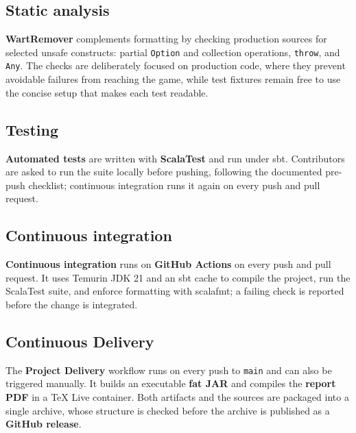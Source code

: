 \subsection{Static analysis}

\textbf{WartRemover} complements formatting by checking production sources for selected unsafe constructs: partial
\texttt{Option} and collection operations, \texttt{throw}, and \texttt{Any}. The checks are deliberately focused on
production code, where they prevent avoidable failures from reaching the game, while test fixtures remain free to use
the concise setup that makes each test readable.

\subsection{Testing}

\textbf{Automated tests} are written with \textbf{ScalaTest} and run under sbt. Contributors are asked to run the suite locally before
pushing, following the documented pre-push checklist; continuous integration runs it again on every push and pull request.

\subsection{Continuous integration}

\textbf{Continuous integration} runs on \textbf{GitHub Actions} on every push and pull request. It uses Temurin JDK 21 and an sbt cache
to compile the project, run the ScalaTest suite, and enforce formatting with scalafmt; a failing check is reported before
the change is integrated.

\subsection{Continuous Delivery}

The \textbf{Project Delivery} workflow runs on every push to \texttt{main} and can also be triggered manually. It builds
an executable \textbf{fat JAR} and compiles the \textbf{report PDF} in a TeX Live container. Both artifacts and the sources are packaged
into a single archive, whose structure is checked before the archive is published as a \textbf{GitHub release}.

